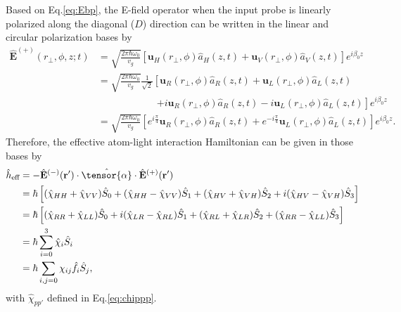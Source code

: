 \documentclass[aps,pra,twocolumn,superscriptaddress]{revtex4-1} %
\def\br{\mathbf{r}}
\newcommand{\nn}{\nonumber}
\newcommand{\eff}{\text{eff}}
\begin{document}
\begin{appendix}
Based on Eq.\eqref{eq:Ebp}, the E-field operator when the input probe is linearly polarized along the diagonal ($ D $) direction can be written in the linear and circular polarization bases by 
\begin{align}
\hat{\mathbf{E}}^{(+)}(r\!_\perp,\phi,z;t) &= \sqrt{ \frac{2 \pi \hbar \omega_0}{ v_g} } \left[\mathbf{u}_H(r\!_\perp,\phi) \hat{a}_H(z,t) + \mathbf{u}_V(r\!_\perp,\phi) \hat{a}_V(z,t)\right]  e^{i \beta_0 z}\\
&= \sqrt{ \frac{2 \pi \hbar \omega_0}{ v_g} } \frac{1}{\sqrt{2}}\left[\mathbf{u}_R(r\!_\perp,\phi) \hat{a}_R(z,t) + \mathbf{u}_L(r\!_\perp,\phi) \hat{a}_L(z,t) \right.\nn\\
&\quad\quad\quad\quad\quad\quad\left. + i\mathbf{u}_R(r\!_\perp,\phi) \hat{a}_R(z,t) - i\mathbf{u}_L(r\!_\perp,\phi) \hat{a}_L(z,t)\right]  e^{i \beta_0 z}\\
&= \sqrt{ \frac{2 \pi \hbar \omega_0}{ v_g} } \left[e^{i\frac{\pi}{4}}\mathbf{u}_R(r\!_\perp,\phi) \hat{a}_R(z,t) + e^{-i\frac{\pi}{4}}\mathbf{u}_L(r\!_\perp,\phi) \hat{a}_L(z,t)\right]  e^{i \beta_0 z}.
\end{align}
Therefore, the effective atom-light interaction Hamiltonian can be given in those bases by 
\begin{align}
\hat{h}_\eff &= -\hat{\mathbf{E}}^{(-)}(\br')\cdot\hat{\tensor{\mathbf{\alpha}}}\cdot\hat{\mathbf{E}}^{(+)}(\br')\nn\\
&= \hbar\left[(\hat{\chi}_{HH}+\hat{\chi}_{VV})\hat{S}_0 + (\hat{\chi}_{HH}-\hat{\chi}_{VV})\hat{S}_1 + (\hat{\chi}_{HV}+\hat{\chi}_{VH})\hat{S}_2 + i(\hat{\chi}_{HV}-\hat{\chi}_{VH})\hat{S}_3 \right]\\
&= \hbar\left[(\hat{\chi}_{RR}+\hat{\chi}_{LL})\hat{S}_0 + i(\hat{\chi}_{LR}-\hat{\chi}_{RL})\hat{S}_1 + (\hat{\chi}_{RL}+\hat{\chi}_{LR})\hat{S}_2 + (\hat{\chi}_{RR}-\hat{\chi}_{LL})\hat{S}_3 \right]\\
&=\hbar\sum_{i=0}^3 \hat{\chi}_{i}\hat{S}_i\\
&=\hbar\sum_{i,j=0} \chi_{ij}\hat{f}_i\hat{S}_j,
\end{align}
with $\hat{\chi}_{pp'} $ defined in Eq.\eqref{eq:chippp}.

\end{appendix}
\end{document}
